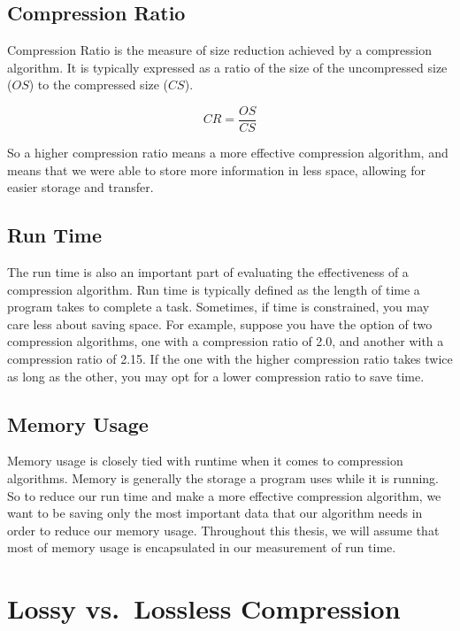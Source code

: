 \documentclass[12pt,twoside]{reedthesis}
\begin{document}
\hypertarget{compression-ratio}{%
\subsection{Compression Ratio}\label{compression-ratio}}

Compression Ratio is the measure of size reduction achieved by a compression algorithm. It is typically expressed as a ratio of the size of the uncompressed size (\(OS\)) to the compressed size (\(CS\)).

\[CR = \frac{OS}{CS}\]

So a higher compression ratio means a more effective compression algorithm, and means that we were able to store more information in less space, allowing for easier storage and transfer.

\hypertarget{run-time}{%
\subsection{Run Time}\label{run-time}}

The run time is also an important part of evaluating the effectiveness of a compression algorithm. Run time is typically defined as the length of time a program takes to complete a task. Sometimes, if time is constrained, you may care less about saving space. For example, suppose you have the option of two compression algorithms, one with a compression ratio of 2.0, and another with a compression ratio of 2.15. If the one with the higher compression ratio takes twice as long as the other, you may opt for a lower compression ratio to save time.

\hypertarget{memory-usage}{%
\subsection{Memory Usage}\label{memory-usage}}

Memory usage is closely tied with runtime when it comes to compression algorithms. Memory is generally the storage a program uses while it is running. So to reduce our run time and make a more effective compression algorithm, we want to be saving only the most important data that our algorithm needs in order to reduce our memory usage. Throughout this thesis, we will assume that most of memory usage is encapsulated in our measurement of run time.

\hypertarget{lossy-vs.-lossless-compression}{%
\section{Lossy vs.~Lossless Compression}\label{lossy-vs.-lossless-compression}}
\end{document}
